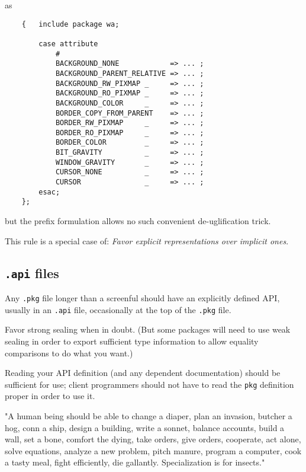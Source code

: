 as

\begin{verbatim}
    {   include package wa;

        case attribute
            #
            BACKGROUND_NONE            => ... ;
            BACKGROUND_PARENT_RELATIVE => ... ;
            BACKGROUND_RW_PIXMAP _     => ... ;
            BACKGROUND_RO_PIXMAP _     => ... ;
            BACKGROUND_COLOR     _     => ... ;
            BORDER_COPY_FROM_PARENT    => ... ;
            BORDER_RW_PIXMAP     _     => ... ;
            BORDER_RO_PIXMAP     _     => ... ;
            BORDER_COLOR         _     => ... ;
            BIT_GRAVITY          _     => ... ; 
            WINDOW_GRAVITY       _     => ... ;
            CURSOR_NONE          _     => ... ;
            CURSOR               _     => ... ;
        esac;
    };
\end{verbatim}

but the prefix formulation allows no such convenient de-uglification trick.

This rule is a special case of: {\it Favor explicit representations over implicit ones}.

\subsection{{\tt .api} files}

Any {\tt .pkg} file longer than a screenful should have an explicitly 
defined API, usually in an {\tt .api} file, occasionally at the top 
of the {\tt .pkg} file.

Favor strong sealing when in doubt.  (But some packages will need 
to use weak sealing in order to export sufficient type information 
to allow equality comparisons to do what you want.) 

Reading your {\sc API} definition (and any dependent documentation) should 
be sufficient for use;  client programmers should not have to read 
the {\tt pkg} definition proper in order to use it.




    "A human being should be able to change a diaper, plan an invasion,
     butcher a hog, conn a ship, design a building, write a sonnet, balance 
     accounts, build a wall, set a bone, comfort the dying, take orders,
     give orders, cooperate, act alone, solve equations, analyze a new 
     problem, pitch manure, program a computer, cook a tasty meal, fight 
     efficiently, die gallantly. Specialization is for insects."

